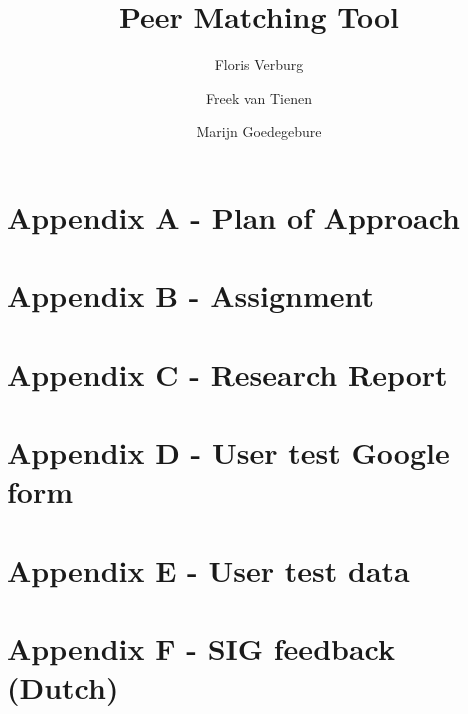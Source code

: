 \documentclass{tudelft-report}
\begin{document}
\frontmatter

\title[TI3800 Bachelorproject]{Peer Matching Tool}
\author{Floris Verburg \and Freek van Tienen \and Marijn Goedegebure}
\makecover







\tableofcontents

\mainmatter













\appendix

%
\chapter{Appendix A - Plan of Approach}


\chapter{Appendix B - Assignment}
\label{app:assignment}


\chapter{Appendix C - Research Report}
\label{appendix_research}


\chapter{Appendix D - User test Google form}
\label{app:survey}


\chapter{Appendix E - User test data}


\chapter{Appendix F - SIG feedback (Dutch)}
\label{app:sig}


%
%



\end{document}
